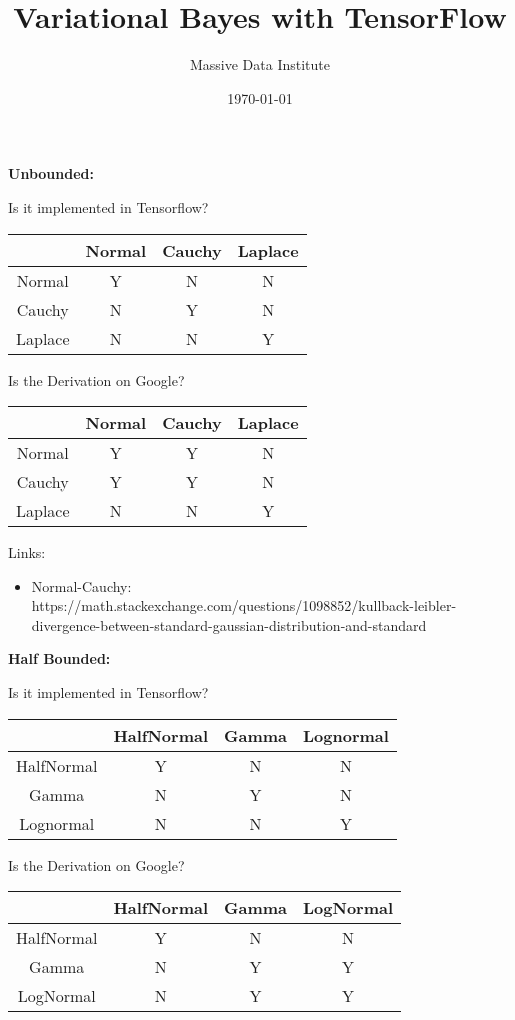 \documentclass{article}
\title{Variational Bayes with TensorFlow}
\author{Massive Data Institute}
\date{\today}
\begin{document}
\maketitle


\textbf{Unbounded:}

Is it implemented in Tensorflow?

\begin{center}
\begin{tabular}{ c | c c c }
 & Normal & Cauchy & Laplace \\
 \hline
 Normal & Y & N & N \\ 
 Cauchy & N & Y & N \\  
 Laplace & N & N & Y    
\end{tabular}
\end{center}

Is the Derivation on Google?

\begin{center}
\begin{tabular}{ c | c c c }
 & Normal & Cauchy & Laplace \\
 \hline
 Normal & Y & Y & N \\ 
 Cauchy & Y & Y & N \\  
 Laplace & N & N & Y    
\end{tabular}
\end{center}

Links:
\begin{itemize}
    \item Normal-Cauchy: https://math.stackexchange.com/questions/1098852/kullback-leibler-divergence-between-standard-gaussian-distribution-and-standard
\end{itemize}


\textbf{Half Bounded:}

Is it implemented in Tensorflow?

\begin{center}
\begin{tabular}{ c | c c c }
 & HalfNormal & Gamma & Lognormal \\
 \hline
 HalfNormal & Y & N & N \\ 
 Gamma & N & Y & N \\  
 Lognormal & N & N & Y    
\end{tabular}
\end{center}

Is the Derivation on Google?

\begin{center}
\begin{tabular}{ c | c c c }
 & HalfNormal & Gamma & LogNormal \\
 \hline
 HalfNormal & Y & N & N \\ 
 Gamma & N & Y & Y \\  
 LogNormal & N & Y & Y   
\end{tabular}
\end{center}
\end{document}
